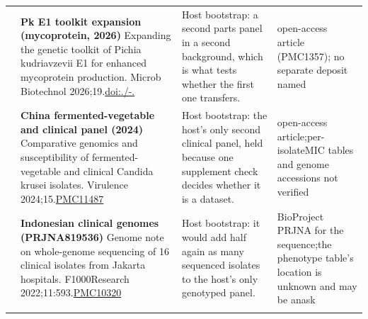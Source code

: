 \begin{landscape}
\begin{longtable}{@{}r@{\hspace{4pt}} L{78mm} L{72mm} L{76mm}@{}}
 & \textbf{Pk E1 toolkit expansion (mycoprotein, 2026)} \newline Expanding the genetic toolkit of Pichia kudriavzevii E1 for enhanced mycoprotein production. Microb Biotechnol 2026;19.\newline \href{https://doi.org/10.1111/1751-7915.70447}{doi:./-.} & Host bootstrap: a second parts panel in a second background, which is what tests whether the first one transfers. & open-\allowbreak access \allowbreak article \allowbreak (PMC1357); n\allowbreak o separa\allowbreak te depos\allowbreak it named \\
 & \textbf{China fermented-vegetable and clinical panel (2024)} \newline Comparative genomics and susceptibility of fermented-vegetable and clinical Candida krusei isolates. Virulence 2024;15.\newline \href{https://www.ncbi.nlm.nih.gov/pmc/articles/PMC11487970/}{PMC11487} & Host bootstrap: the host's only second clinical panel, held because one supplement check decides whether it is a dataset. & open-\allowbreak access \allowbreak article;\allowbreak  per-\allowbreak isolate\allowbreak  MIC tab\allowbreak les and \allowbreak genome a\allowbreak ccession\allowbreak s not ve\allowbreak rified \\
 & \textbf{Indonesian clinical genomes (PRJNA819536)} \newline Genome note on whole-genome sequencing of 16 clinical isolates from Jakarta hospitals. F1000Research 2022;11:593.\newline \href{https://www.ncbi.nlm.nih.gov/pmc/articles/PMC10320322/}{PMC10320} & Host bootstrap: it would add half again as many sequenced isolates to the host's only genotyped panel. & BioProje\allowbreak ct PRJNA f\allowbreak or the s\allowbreak equence;\allowbreak  the phe\allowbreak notype t\allowbreak able's l\allowbreak ocation \allowbreak is unkno\allowbreak wn and m\allowbreak ay be an\allowbreak  ask \\
\addlinespace[5pt]

\end{longtable}
\end{landscape}
